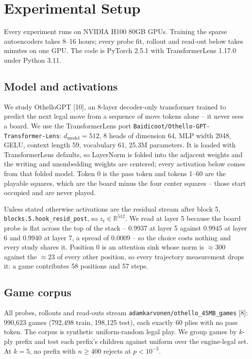 \section{Experimental Setup}

Every experiment runs on NVIDIA H100 80GB GPUs. Training the sparse autoencoders takes 8--16
hours; every probe fit, rollout and read-out below takes minutes on one GPU. The code is PyTorch
2.5.1 with TransformerLens 1.17.0 under Python 3.11.

\subsection{Model and activations}

We study OthelloGPT [10], an 8-layer decoder-only transformer trained to
predict the next legal move from a sequence of move tokens alone -- it never sees a board. We
use the TransformerLens port \texttt{Baidicoot/Othello-GPT-Transformer-Lens}: $d_{\mathrm{model}} =
512$, 8 heads of dimension 64, MLP width 2048, GELU, context length 59, vocabulary 61, 25.3M
parameters. It is loaded with TransformerLens defaults, so LayerNorm is folded into the
adjacent weights and the writing and unembedding weights are centered; every activation below
comes from that folded model. Token 0 is the pass token and tokens 1--60 are the playable
squares, which are the board minus the four center squares -- those start occupied and are
never played.

Unless stated otherwise activations are the residual stream after block 5,
\texttt{blocks.5.hook\_resid\_post}, so $z_t \in \mathbb{R}^{512}$. We read at layer 5 because the board probe is
flat across the top of the stack -- 0.9937 at layer 5 against 0.9945 at layer 6 and 0.9940 at
layer 7, a spread of 0.0009 -- so the choice costs nothing and every study shares it. Position 0
is an attention sink whose norm is $\approx 300$ against the $\approx 23$ of every other
position, so every trajectory measurement drops it: a game contributes 58
positions and 57 steps.

\subsection{Game corpus}

All probes, rollouts and read-outs stream \texttt{adamkarvonen/othello\_45MB\_games} [8]: 990,623
games (792,498 train, 198,125 test), each exactly 60 plies with no pass token. The corpus is
synthetic uniform-random legal play. We group games by $k$-ply prefix and test each prefix's
children against uniform over the engine-legal set. At $k = 5$, no prefix with $n \ge 400$
rejects at $p < 10^{-3}$.

